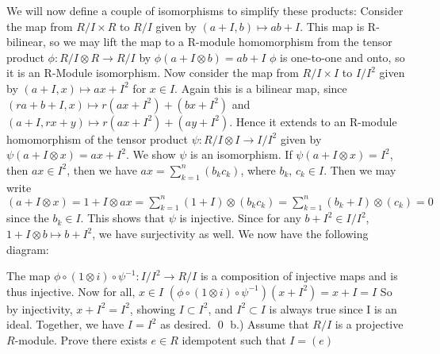 \documentclass{article}
\begin{document}
\newline
We will now define a couple of isomorphisms to simplify these products:
\newline
Consider the map from $R/I \times R$ to $R/I$ given by $(a+ I , b) \mapsto ab + I$.  This map is R- bilinear, so we may lift the map to a R-module homomorphism from the tensor product $\phi: R/I \otimes R \rightarrow R/I$ by $\phi(a+ I \otimes b) = ab + I$ \newline
 $\phi$ is one-to-one and onto, so it is an R-Module isomorphism.
\newline
Now consider the map from $R/I \times I$ to $I/I^2$ given by $(a+ I, x) \mapsto ax + I^2$ for $x \in I$. Again this is a bilinear map, since $(ra+ b + I, x) \mapsto r(ax + I^2) + (bx + I^2)$ and $(a+ I, rx+y) \mapsto r(ax+I^2)+(ay+I^2)$.  Hence it extends to an R-module homomorphism of the tensor product
$\psi: R/I \otimes I \rightarrow I/I^2$ given by $\psi(a+ I \otimes x) = ax + I^2$.
\newline
\newline
 We show $\psi$ is an isomorphism.
If $\psi(a+ I \otimes x) = I^2$, then $ax \in I^2$, then we have $ax = \sum_{k=1}^n ({b_k}{c_k})$, where $b_k$, $c_k \in I$.  Then we may write $(a+ I \otimes x)= 1+ I \otimes ax =  \sum_{k=1}^n(1+I)\otimes ({b_k}{c_k}) = \sum_{k=1}^n(b_k+I)\otimes ({c_k}) = 0$ since the $b_k \in I$.
This shows that $\psi$ is injective.
Since for any $b+ I^2 \in I/I^2 $, $1+ I \otimes b \mapsto b+I^2$, we have surjectivity as well.
\newline
We now have the following diagram:
\newline
{}
\newline
The map $\phi \circ (1\otimes i) \circ \psi^{-1}:I/I^2 \rightarrow R/I$ is a composition of injective maps and is thus injective.  Now for all, $x\in I$ $(\phi \circ (1\otimes i) \circ \psi^{-1})(x+ I^2) = x+ I = I$ So by injectivity, $x +  I^2 = I^2$, showing $I \subset I^2$, and $I^2 \subset I$ is always true since I is an ideal.  Together, we have $I = I^2$ as desired. \qed
\newline
\newline
b.) Assume that $R/I$ is a projective $R$-module.  Prove there exists $e\in R$ idempotent such that $I = (e)$
\end{document}
